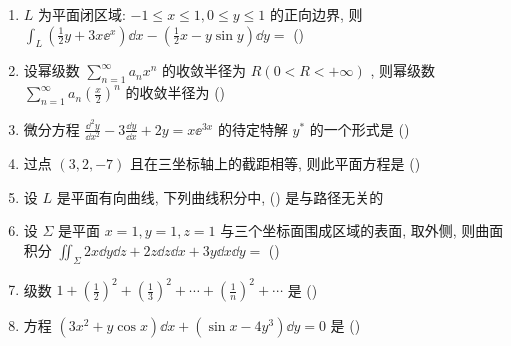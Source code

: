 \begin{enumerate}
	\item $L$ 为平面闭区域: $-1 \leq x \leq 1,0 \leq y \leq 1$ 的正向边界, 则 $\int_{L}\left(\frac{1}{2} y+3 x \ee^{x}\right) \dd x-\left(\frac{1}{2} x-y \sin y\right) \dd y=$ (\hspace{1pc})
	
	\item 设幂级数 $\sum_{n=1}^{\infty} a_{n} x^{n}$ 的收敛半径为 $R(0<R<+\infty)$ , 则幂级数 $\sum_{n=1}^{\infty} a_{n}\left(\frac{x}{2}\right)^{n}$ 的收敛半径为 (\hspace{1pc})
	
	\item 微分方程 $\frac{\dd^{2} y}{\dd x^{2}}-3 \frac{\dd y}{\dd x}+2 y=x \ee^{3 x}$ 的待定特解 $y^{*}$ 的一个形式是 (\hspace{1pc})
	
	\item 过点 $(3,2,-7)$  且在三坐标轴上的截距相等, 则此平面方程是 (\hspace{1pc})
	
	\item 设 $L$ 是平面有向曲线, 下列曲线积分中, (\hspace{1pc}) 是与路径无关的
	
	\item 设 $\Sigma$ 是平面 $x=1, y=1, z=1$ 与三个坐标面围成区域的表面, 取外侧, 则曲面积分 $\iint_{\Sigma} 2 x \dd y \dd z+2 z \dd z \dd x+3 y \dd x \dd y=$ (\hspace{1pc})
	
	\item 级数 $1+\left(\frac{1}{2}\right)^{2}+\left(\frac{1}{3}\right)^{2}+\cdots+\left(\frac{1}{n}\right)^{2}+\cdots$ 是 (\hspace{1pc})
	
	\item 方程 $\left(3 x^{2}+y \cos x\right) \dd x+\left(\sin x-4 y^{3}\right) \dd y=0$ 是 (\hspace{1pc})
	

\end{enumerate}
